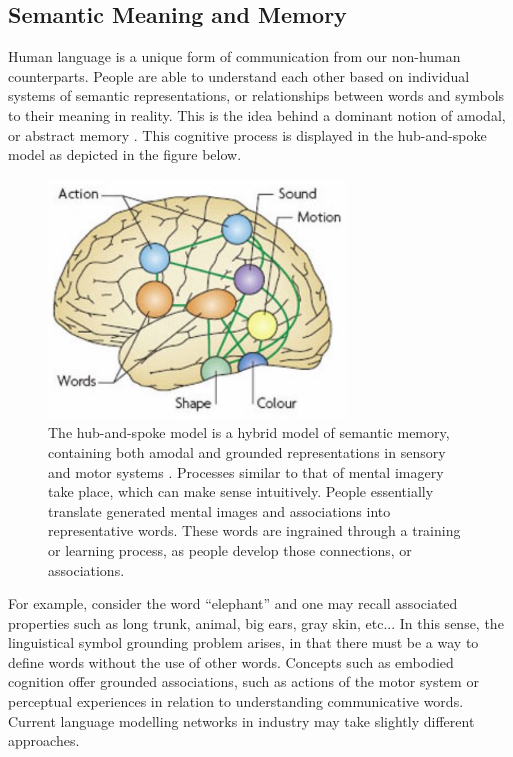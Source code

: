 \documentclass[12pt]{article}
\begin{document}
\subsection{Semantic Meaning and Memory}
Human language is a unique form of communication from our non-human counterparts. People are able to understand each other based on individual systems of semantic representations, or relationships between words and symbols to their meaning in reality. This is the idea behind a dominant notion of amodal, or abstract memory \cite{c6}. This cognitive process is displayed in the hub-and-spoke model as depicted in the figure below.\\
\begin{figure}[ht!] %
\centering
\hspace*{-0.3cm} 
\includegraphics[height=2.5in]{semanticBrain.JPG}
\caption{The hub-and-spoke model is a hybrid model of semantic memory, containing both amodal and grounded representations in sensory and motor systems \cite{c6, c17}. Processes similar to that of mental imagery take place, which can make sense intuitively. People essentially translate generated mental images and associations into representative words. These words are ingrained through a training or learning process, as people develop those connections, or associations.}
\label{semantic_brain}
\end{figure}

For example, consider the word ``elephant'' and one may recall associated properties such as long trunk, animal, big ears, gray skin, etc... In this sense, the linguistical symbol grounding problem arises, in that there must be a way to define words without the use of other words. Concepts such as embodied cognition offer grounded associations, such as actions of the motor system or perceptual experiences in relation to understanding communicative words. Current language modelling networks in industry may take slightly different approaches.
\end{document}
